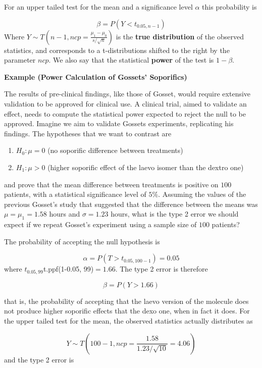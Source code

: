 \documentclass[
]{book}
\providecommand{\tightlist}{%
  \setlength{\itemsep}{0pt}\setlength{\parskip}{0pt}}
\begin{document}
For an upper tailed test for the mean and a significance level \(\alpha\) this probability is

\[\beta= P(Y < t_{0.05, n-1})\]
Where \(Y \sim T(n-1, ncp=\frac{\mu_1-\mu_0}{s/\sqrt{n}})\) is the \textbf{true distribution} of the observed statistics, and corresponds to a t-distributions shifted to the right by the parameter \(ncp\). We also say that the statistical \textbf{power} of the test is \(1-\beta\).

\textbf{Example (Power Calculation of Gossets' Soporifics)}

The results of pre-clinical findings, like those of Gosset, would require extensive validation to be approved for clinical use. A clinical trial, aimed to validate an effect, needs to compute the statistical power expected to reject the null to be approved. Imagine we aim to validate Gossets experiments, replicating his findings. The hypotheses that we want to contrast are

\begin{enumerate}
\def\labelenumi{\alph{enumi}.}
\tightlist
\item
  \(H_0 : \mu = 0\) (no soporific difference between treatments)
\item
  \(H_1 : \mu > 0\) (higher soporific effect of the laevo isomer than the dextro one)
\end{enumerate}

and prove that the mean difference between treatments is positive on \(100\) patients, with a statistical significance level of \(5\%\). Assuming the values of the previous Gosset's study that suggested that the difference between the means was \(\mu=\mu_1=1.58\) hours and \(\sigma=1.23\) hours, what is the type 2 error we should expect if we repeat Gosset's experiment using a sample size of \(100\) patients?

The probability of accepting the null hypothesis is

\[\alpha = P(T> t_{0.05, 100-1})=0.05\]
where \(t_{0.05, 99}\)t.ppf(1-0.05, 99)\(=1.66\). The type 2 error is therefore

\[\beta= P(Y > 1.66)\]

that is, the probability of accepting that the laevo version of the molecule does not produce higher soporific effects that the dexo one, when in fact it does. For the upper tailed test for the mean, the observed statistics actually distributes as

\[Y \sim T(100-1, ncp=\frac{1.58}{1.23/\sqrt{10}}= 4.06)\] and the type 2 error is
\end{document}
